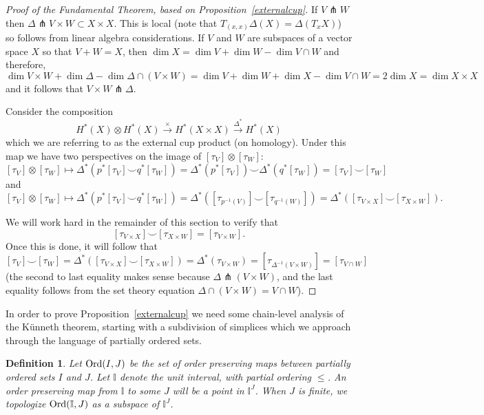\documentclass{amsart}          %
\newtheorem{definition}[theorem]{Definition}
\newcommand{\I}{\mathbb I}
\begin{document}
\begin{proof}[Proof of the Fundamental Theorem, based on Proposition~\ref{externalcup}]
If $V \pitchfork W$ then $\Delta \pitchfork V \times W \subset X \times X$. This is local (note that $T_{(x,x)}\Delta(X) = \Delta(T_xX)$) so follows from linear algebra considerations. If $V$ and $W$ are subspaces of a vector space $X$ so that $V+ W= X$, then $\dim X = \dim V+ \dim W - \dim V\cap W$ and therefore, 
\[
\dim V\times W + \dim \Delta - \dim \Delta\cap (V\times W) = \dim V + \dim W + \dim X - \dim V\cap W= 2\dim X= \dim X\times X
\]
and it follows that $V\times W\pitchfork \Delta$. 

Consider the composition 
\[
H^{\ast}(X)\otimes H^{\ast}(X)\xrightarrow{\times} H^{\ast}(X\times X)\xrightarrow{\Delta^*}H^{\ast}(X)
\]
which we are referring to as the external cup product (on homology). Under this map we have two perspectives on the image of $[\tau_V]\otimes[\tau_W]$:
\[
[\tau_V]\otimes[\tau_W]\mapsto \Delta^{\ast}(p^{\ast}[\tau_V]\smile q^{\ast}[\tau_W]) = \Delta^{\ast}(p^{\ast}[\tau_V])\smile\Delta^{\ast}(q^{\ast}[\tau_W]) = [\tau_V]\smile[\tau_W]
\]
and
\[
[\tau_V]\otimes[\tau_W]\mapsto \Delta^{\ast}(p^{\ast}[\tau_V]\smile q^{\ast}[\tau_W]) = \Delta^{\ast}([\tau_{p^{-1}(V)}]\smile [\tau_{q^{-1}(W)}]) = \Delta^{\ast}([\tau_{V\times X}]\smile[\tau_{X\times W}]).
\]

We will work hard in the remainder of this section to verify that 
\[
[\tau_{V\times X}]\smile[\tau_{X\times W}]= [\tau_{V\times W}].
\]
Once this is done, it will follow that
\[
[\tau_V]\smile [\tau_W] = \Delta^{\ast}([\tau_{V\times X}]\smile[\tau_{X\times W}])= \Delta^{\ast}(\tau_{V\times W}) = [\tau_{\Delta^{-1}(V\times W)}] =[\tau_{V\cap W}]
\]
(the second to last equality makes sense because $\Delta\pitchfork (V\times W)$, and the last equality follows from the set theory equation $\Delta\cap(V\times W) = V\cap W$). 

\end{proof}


In order to prove Proposition~\ref{externalcup} we need some chain-level analysis of the K\"unneth theorem, starting with 
a subdivision of simplices which we approach through the language of partially ordered sets.

\begin{definition}
Let ${\rm Ord}(I,J)$ be the set of order preserving maps between partially ordered sets $I$ and $J$.  Let $\I$ denote the unit interval,
with partial ordering $\leq$.  An order preserving map from $\I$ to some $J$ will be a point in  $\I^J$.  When $J$ is finite, we topologize
${\rm Ord}(\I, J)$ as a subspace of $\I^J$.
\end{definition}
\end{document}
